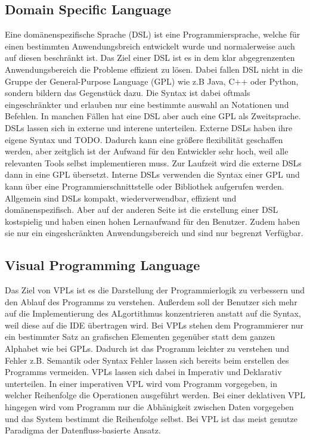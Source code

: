 \documentclass{article}
\begin{document}
    \subsection{Domain Specific Language}
    Eine domänenspezifische Sprache (DSL) ist eine Programmiersprache, welche für einen bestimmten Anwendungsbreich entwickelt wurde und normalerweise auch auf diesen beschränkt ist.
    Das Ziel einer DSL ist es in dem klar abgegrenzenten Anwendungsbereich die Probleme effizient zu lösen. \cite{18}
    Dabei fallen DSL nicht in die Gruppe der General-Purpose Language (GPL) wie z.B Java, C++ oder Python, sondern bildern das Gegenstück dazu. \cite{14}
    Die Syntax ist dabei oftmals eingeschränkter und erlauben nur eine bestimmte auswahl an Notationen und Befehlen. In manchen Fällen hat eine DSL aber auch eine GPL als Zweitsprache. \cite{18}
    DSLs lassen sich in externe und interene unterteilen. Externe DSLs haben ihre eigene Syntax und TODO. Dadurch kann eine größere flexibilität geschaffen werden, aber zeitglich ist der Aufwand für den Entwickler sehr hoch, weil alle relevanten Tools selbst implementieren muss. \cite{7}
    Zur Laufzeit wird die externe DSLs dann in eine GPL übersetzt. \cite{14}
    Interne DSLs verwenden die Syntax einer GPL und kann über eine Programmierschnittstelle oder Bibliothek aufgerufen werden. \cite{14}
    Allgemein sind DSLs kompakt, wiederverwendbar, effizient und domänenspezifisch. Aber auf der anderen Seite ist die erstellung einer DSL kostspielig und haben einen hohen Lernaufwand für den Benutzer. Zudem haben sie nur ein eingeshcränkten Anwendungsbereich und sind nur begrenzt Verfügbar. \cite{18} 
    \subsection{Visual Programming Language}
    Das Ziel von VPLs ist es die Darstellung der Programmierlogik zu verbessern und den Ablauf des Programms zu verstehen. \cite{13} Außerdem soll der Benutzer sich mehr auf die Implementierung des ALgortithmus konzentrieren anstatt auf die Syntax, weil diese auf die IDE übertragen wird. \cite{10}
    Bei VPLs stehen dem Programmierer nur ein bestimmter Satz an grafischen Elementen gegenüber statt dem ganzen Alphabet wie bei GPLs. Dadurch ist das Programm leichter zu verstehen und Fehler z.B. Semantik oder Syntax Fehler lassen sich bereits beim erstellen des Programms vermeiden. \cite{10}
    VPLs lassen sich dabei in Imperativ und Deklarativ unterteilen. In einer imperativen VPL wird vom Programm vorgegeben, in welcher Reihenfolge die Operationen ausgeführt werden. Bei einer deklativen VPL hingegen wird vom Programm nur die Abhänigkeit zwischen Daten vorgegeben und das System bestimmt die Reihenfolge selbst. \cite{21}
    Bei VPL ist das meist genutze Paradigma der Datenfluss-basierte Ansatz. \cite{6}
\end{document}
